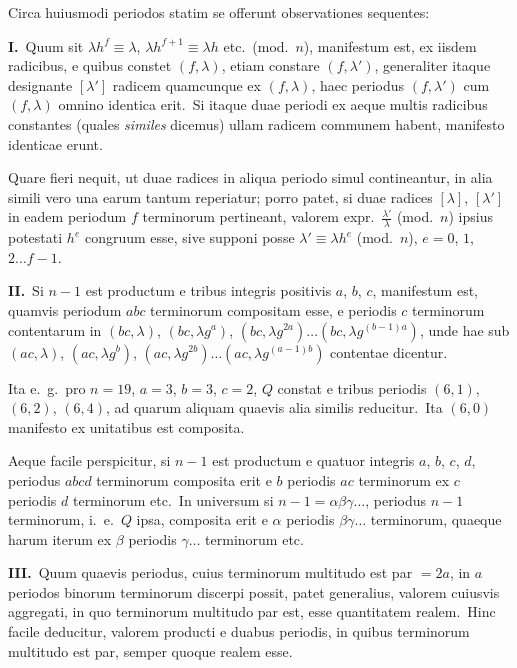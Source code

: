 \documentclass[12pt,a4paper]{article}
\theoremstyle{plain}
\theoremstyle{definition}
\theoremstyle{remark}
\begin{document}
Circa huiusmodi periodos statim se offerunt observationes sequentes:

\textbf{I.}\ Quum sit $\lambda h^f\equiv\lambda$, $\lambda h^{f+1}\equiv\lambda h$ etc.\ (mod.\ $n$),
manifestum est, ex iisdem radicibus, e quibus constet $(f,\lambda)$, etiam
constare $(f,\lambda')$, generaliter itaque designante $[\lambda']$ radicem quamcunque ex
$(f,\lambda)$, haec periodus $(f,\lambda')$ cum $(f,\lambda)$ omnino identica erit.\ Si itaque
duae periodi ex aeque multis radicibus constantes (quales \emph{similes} dicemus)
ullam radicem communem habent, manifesto identicae erunt.

Quare fieri nequit, ut duae radices in aliqua periodo simul contineantur,
in alia simili vero una earum tantum reperiatur; porro patet, si duae
radices $[\lambda]$, $[\lambda']$ in eadem periodum $f$ terminorum pertineant, valorem
expr.\ $\frac{\lambda'}{\lambda}$ (mod.\ $n$) ipsius potestati $h^e$ congruum esse, sive supponi
posse $\lambda'\equiv\lambda h^e$ (mod.\ $n$), $e=0$, $1$, $2\dots f-1$.

\textbf{II.}\ Si $n-1$ est productum e tribus integris positivis $a$, $b$, $c$,
manifestum est, quamvis periodum $abc$ terminorum compositam esse, e
periodis $c$ terminorum contentarum in $(bc,\lambda)$, $(bc,\lambda g^a)$,
$(bc,\lambda g^{2a})\dots(bc,\lambda g^{(b-1)a})$, unde hae sub $(ac,\lambda)$, $(ac,\lambda g^b)$,
$(ac,\lambda g^{2b})\dots(ac,\lambda g^{(a-1)b})$ contentae dicentur.

Ita e.\ g.\ pro $n=19$, $a=3$, $b=3$, $c=2$, $Q$ constat e tribus
periodis $(6,1)$, $(6,2)$, $(6,4)$, ad quarum aliquam quaevis alia similis
reducitur.\ Ita $(6,0)$ manifesto ex unitatibus est composita.

Aeque facile perspicitur, si $n-1$ est productum e quatuor integris
$a$, $b$, $c$, $d$, periodus $abcd$ terminorum composita erit e $b$ periodis
$ac$ terminorum ex $c$ periodis $d$ terminorum etc.\ In universum si
$n-1=\alpha\beta\gamma\dots$, periodus $n-1$ terminorum, i.\ e.\ $Q$ ipsa,
composita erit e $\alpha$ periodis $\beta\gamma\dots$ terminorum, quaeque harum iterum
ex $\beta$ periodis $\gamma\dots$ terminorum etc.

\textbf{III.}\ Quum quaevis periodus, cuius terminorum multitudo est par
$=2a$, in $a$ periodos binorum terminorum discerpi possit, patet generalius,
valorem cuiusvis aggregati, in quo terminorum multitudo par est, esse
quantitatem realem.\ Hinc facile deducitur, valorem producti e duabus
periodis, in quibus terminorum multitudo est par, semper quoque realem
esse.
\end{document}

